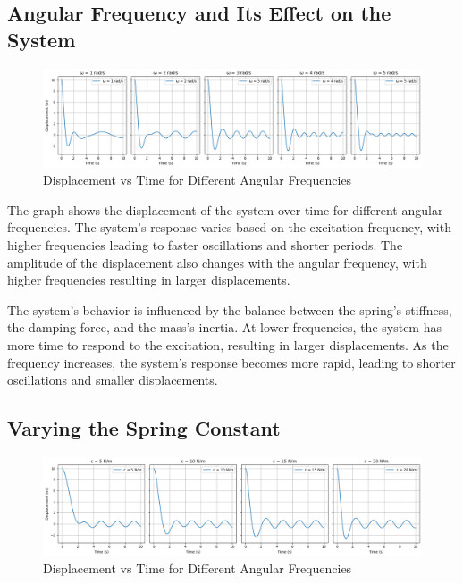 \documentclass[12pt,a4paper]{article}
\begin{document}
{\vspace{10pt}}

\subsection{Angular Frequency and Its Effect on the System}
\begin{figure}[H]
    \centering
    \includegraphics[width=1\textwidth]{angular_freq_effect_on_system.png} 
    \caption{Displacement vs Time for Different Angular Frequencies}
    \label{fig:system}
\end{figure}
{\vspace{10pt}}


The graph shows the displacement of the system over time for different angular frequencies. The system's response varies based on the excitation frequency, with higher frequencies leading to faster oscillations and shorter periods. The amplitude of the displacement also changes with the angular frequency, with higher frequencies resulting in larger displacements.

The system's behavior is influenced by the balance between the spring's stiffness, the damping force, and the mass's inertia. At lower frequencies, the system has more time to respond to the excitation, resulting in larger displacements. As the frequency increases, the system's response becomes more rapid, leading to shorter oscillations and smaller displacements.



{\vspace{10pt}}

\subsection{Varying the Spring Constant}
\begin{figure}[H]
    \centering
    \includegraphics[width=1\textwidth]{spring_constant_effect_on_system.png} 
    \caption{Displacement vs Time for Different Angular Frequencies}
    \label{fig:system}
\end{figure}
{\vspace{10pt}}
\end{document}
